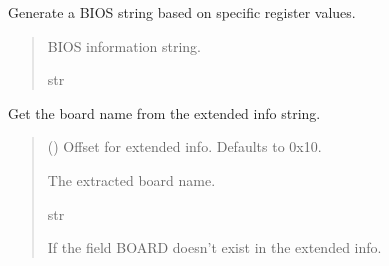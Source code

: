 \documentclass[letterpaper,10pt,english]{sphinxmanual}
\begin{document}
\begin{fulllineitems}
\begin{fulllineitems}
\end{fulllineitems}


\begin{fulllineitems}
\label{\detokenize{apidocs:management.MANAGEMENT.get_bios}}
\pysigstartsignatures
{}
\pysigstopsignatures
\sphinxAtStartPar
Generate a BIOS string based on specific register values.
\begin{quote}\begin{description}
\sphinxAtStartPar
BIOS information string.

\sphinxAtStartPar
str

\end{description}\end{quote}

\end{fulllineitems}


\begin{fulllineitems}
\label{\detokenize{apidocs:management.MANAGEMENT.get_board}}
\pysigstartsignatures
{}
\pysigstopsignatures
\sphinxAtStartPar
Get the board name from the extended info string.
\begin{quote}\begin{description}
\sphinxAtStartPar
{} (\sphinxstyleliteralemphasis{\sphinxupquote{, }}) \textendash{} Offset for extended info. Defaults to 0x10.

\sphinxAtStartPar
The extracted board name.

\sphinxAtStartPar
str

\sphinxAtStartPar
{} \textendash{} If the field BOARD doesn’t exist in the extended info.

\end{description}\end{quote}


\end{fulllineitems}
\end{fulllineitems}
\end{document}
